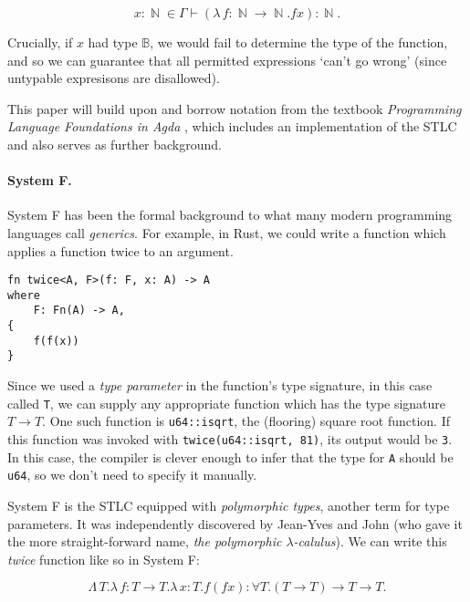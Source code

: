\documentclass[logo,bsc,singlespacing,parskip,online]{infthesis}
\DeclareMathOperator{\nat}{\mathbb{N}}
\begin{document}
\begin{equation*}
  x \colon \nat \in \Gamma \vdash (\lambda \, f \colon \nat \to \nat . f x) \colon \nat.
\end{equation*}

Crucially, if $x$ had type $\mathbb{B}$, we would fail to determine the type of
the function, and so we can guarantee that all permitted expressions `can't go
wrong' \citep{milner_theory_1978} (since untypable expresisons are disallowed).

This paper will build upon and borrow notation from the textbook
\textit{Programming Language Foundations in Agda}
\citep{wadler_programming_2022}, which includes an implementation of the STLC
and also serves as further background.

\paragraph*{System F.} System F has been the formal background to what many modern programming
languages call \textit{generics}. For example, in Rust, we could write a function which applies a
function twice to an argument.

\begin{verbatim}
fn twice<A, F>(f: F, x: A) -> A
where
    F: Fn(A) -> A,
{
    f(f(x))
}
\end{verbatim}

Since we used a \textit{type parameter} in the function's type signature, in this case called
\texttt{T}, we can supply any appropriate function which has the type signature $T \to T$. One such
function is \texttt{u64::isqrt}, the (flooring) square root function. If this function was invoked
with \texttt{twice(u64::isqrt, 81)}, its output would be \texttt{3}. In this case, the compiler is
clever enough to infer that the type for \texttt{A} should be \texttt{u64}, so we don't need to
specify it manually.

System F is the STLC equipped with \textit{polymorphic types}, another term for type parameters. It
was independently discovered by Jean-Yves  and John (who gave it the more straight-forward name,
\textit{the polymorphic
$\lambda$-calulus}). We can write this \textit{twice} function like so in System F:

\begin{equation*}
  \Lambda \, T. \lambda \, f \colon T \to T . \lambda \, x \colon T . f (f x) \colon \forall T . (T \to T) \to T \to T.
\end{equation*}
\end{document}
